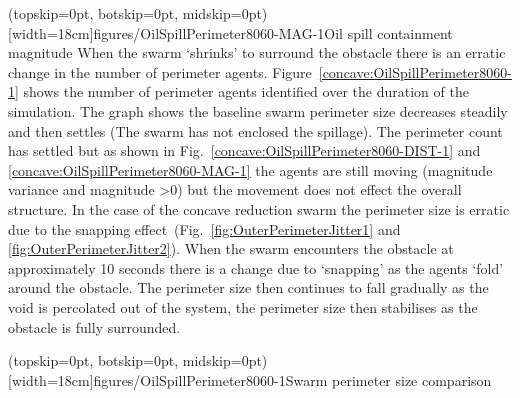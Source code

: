 \documentclass{ieeeaccess}
\begin{document}
\Figure[t!](topskip=0pt, botskip=0pt, midskip=0pt)[width=18cm]{figures/OilSpillPerimeter8060-MAG-1}{Oil spill containment magnitude\label{concave:OilSpillPerimeter8060-MAG-1}}
When the swarm `shrinks' to surround the obstacle there is an erratic change in the number of perimeter agents. Figure~\ref{concave:OilSpillPerimeter8060-1} shows the number of perimeter agents identified over the duration of the simulation. The graph shows the baseline swarm perimeter size decreases steadily and then settles (The swarm has not enclosed the spillage). The perimeter count has settled but as shown in Fig.~\ref{concave:OilSpillPerimeter8060-DIST-1} and \ref{concave:OilSpillPerimeter8060-MAG-1} the agents are still moving (magnitude variance and magnitude \textgreater 0) but the movement does not effect the overall structure. 
In the case of the concave reduction swarm the perimeter size is erratic due to the snapping effect~(Fig.~\ref{fig:OuterPerimeterJitter1} and \ref{fig:OuterPerimeterJitter2}). When the swarm encounters the obstacle at approximately 10 seconds there is a change due to `snapping' as the agents `fold' around the obstacle. The perimeter size then continues to fall gradually as the void is percolated out of the system, the perimeter size then stabilises as the obstacle is fully surrounded.

\Figure[t!](topskip=0pt, botskip=0pt, midskip=0pt)[width=18cm]{figures/OilSpillPerimeter8060-1}{Swarm perimeter size comparison\label{concave:OilSpillPerimeter8060-1}}
\end{document}

